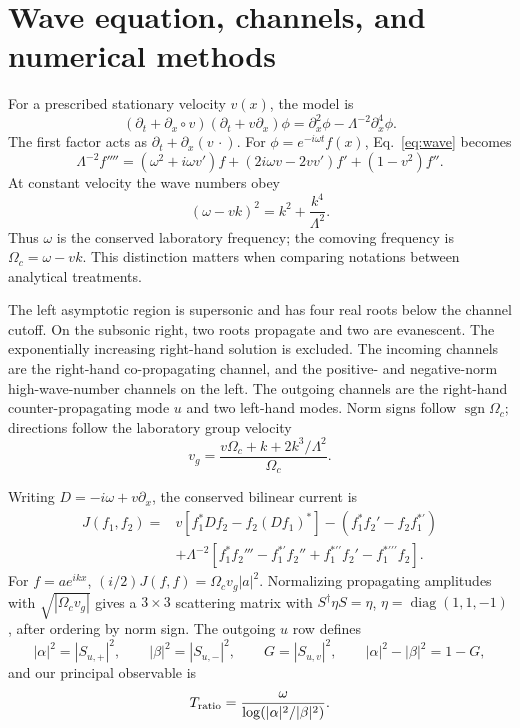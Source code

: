 \documentclass[10pt,a4paper]{article}
\begin{document}
\section{Wave equation, channels, and numerical methods}
\label{sec:model}
For a prescribed stationary velocity $v(x)$, the model is
\begin{equation}
 (\partial_t+\partial_x\circ v)(\partial_t+v\partial_x)\phi
 =\partial_x^2\phi-\Lambda^{-2}\partial_x^4\phi .
 \label{eq:wave}
\end{equation}
The first factor acts as $\partial_t+\partial_x(v\,\cdot)$.
For $\phi=e^{-i\omega t}f(x)$, Eq.~\eqref{eq:wave} becomes
\begin{equation}
 \Lambda^{-2}f''''=(\omega^2+i\omega v')f
 +(2i\omega v-2vv')f'+(1-v^2)f''.
 \label{eq:ode}
\end{equation}
At constant velocity the wave numbers obey
\begin{equation}
 (\omega-vk)^2=k^2+\frac{k^4}{\Lambda^2}.
 \label{eq:disp}
\end{equation}
Thus $\omega$ is the conserved laboratory frequency; the comoving frequency
is $\Omega_c=\omega-vk$. This distinction matters when comparing
notations between analytical treatments.

The left asymptotic region is supersonic and has four real roots below
the channel cutoff. On the subsonic right, two roots propagate and two
are evanescent. The exponentially increasing right-hand solution is
excluded. The incoming channels are the right-hand co-propagating
channel, and the positive- and negative-norm high-wave-number channels
on the left. The outgoing channels are the right-hand counter-propagating
mode $u$ and two left-hand modes. Norm signs follow $\operatorname{sgn}\Omega_c$;
directions follow the laboratory group velocity
\begin{equation}
 v_g=\frac{v\Omega_c+k+2k^3/\Lambda^2}{\Omega_c}.
\end{equation}

Writing $D=-i\omega+v\partial_x$, the conserved bilinear current is
\begin{align}
 J(f_1,f_2)={}&v[f_1^*Df_2-f_2(Df_1)^*]
 -(f_1^*f_2'-f_2f_1^{*\prime})\nonumber\\
 &+\Lambda^{-2}[f_1^*f_2'''-f_1^{*\prime}f_2''
                  +f_1^{*\prime\prime}f_2'-f_1^{*\prime\prime\prime}f_2].
 \label{eq:current}
\end{align}
For $f=a e^{ikx}$, $(i/2)J(f,f)=\Omega_c v_g|a|^2$.
Normalizing propagating amplitudes with $\sqrt{|\Omega_c v_g|}$ gives
a $3\times3$ scattering matrix with $S^\dagger\eta S=\eta$,
$\eta=\operatorname{diag}(1,1,-1)$, after ordering by norm sign.
The outgoing $u$ row defines
\begin{equation}
 |\alpha|^2=|S_{u,+}|^2,\qquad |\beta|^2=|S_{u,-}|^2,\qquad
 G=|S_{u,v}|^2,\qquad |\alpha|^2-|\beta|^2=1-G,
\end{equation}
and our principal observable is
\begin{equation}
 T_{\rm ratio}=\frac{\omega}{\log(|\alpha|^2/|\beta|^2)}.
 \label{eq:temp}
\end{equation}
\end{document}

